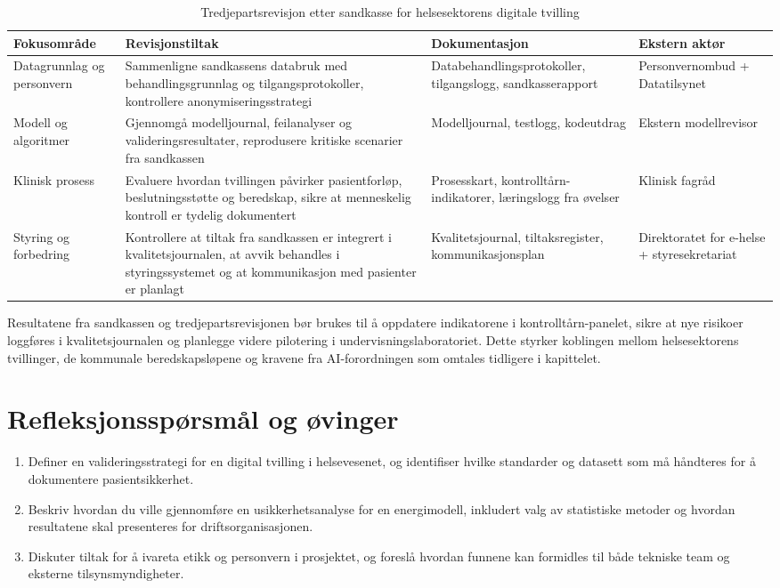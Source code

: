 \begin{table}[ht]
    \centering
    \caption{Tredjepartsrevisjon etter sandkasse for helsesektorens digitale tvilling}
    \label{tab:tredjepartsrevisjon}
    \begin{tabular}{|p{3.2cm}|p{4.6cm}|p{4.6cm}|p{3.0cm}|}
        \hline
        \textbf{Fokusområde} & \textbf{Revisjonstiltak} & \textbf{Dokumentasjon} & \textbf{Ekstern aktør} \\
        \hline
        Datagrunnlag og personvern & Sammenligne sandkassens databruk med behandlingsgrunnlag og tilgangsprotokoller, kontrollere anonymiseringsstrategi & Databehandlingsprotokoller, tilgangslogg, sandkasserapport & Personvernombud + Datatilsynet \\
        \hline
        Modell og algoritmer & Gjennomgå modelljournal, feilanalyser og valideringsresultater, reprodusere kritiske scenarier fra sandkassen & Modelljournal, testlogg, kodeutdrag & Ekstern modellrevisor \\
        \hline
        Klinisk prosess & Evaluere hvordan tvillingen påvirker pasientforløp, beslutningsstøtte og beredskap, sikre at menneskelig kontroll er tydelig dokumentert & Prosesskart, kontrolltårn-indikatorer, læringslogg fra øvelser & Klinisk fagråd \\
        \hline
        Styring og forbedring & Kontrollere at tiltak fra sandkassen er integrert i kvalitetsjournalen, at avvik behandles i styringssystemet og at kommunikasjon med pasienter er planlagt & Kvalitetsjournal, tiltaksregister, kommunikasjonsplan & Direktoratet for e-helse + styresekretariat \\
        \hline
    \end{tabular}
\end{table}

Resultatene fra sandkassen og tredjepartsrevisjonen bør brukes til å oppdatere indikatorene i kontrolltårn-panelet, sikre at nye risikoer loggføres i kvalitetsjournalen og planlegge videre pilotering i undervisningslaboratoriet. Dette styrker koblingen mellom helsesektorens tvillinger, de kommunale beredskapsløpene og kravene fra AI-forordningen som omtales tidligere i kapittelet.

\section{Refleksjonsspørsmål og øvinger}
\begin{enumerate}
    \item Definer en valideringsstrategi for en digital tvilling i helsevesenet, og identifiser hvilke standarder og datasett som må håndteres for å dokumentere pasientsikkerhet.
    \item Beskriv hvordan du ville gjennomføre en usikkerhetsanalyse for en energimodell, inkludert valg av statistiske metoder og hvordan resultatene skal presenteres for driftsorganisasjonen.
    \item Diskuter tiltak for å ivareta etikk og personvern i prosjektet, og foreslå hvordan funnene kan formidles til både tekniske team og eksterne tilsynsmyndigheter.
\end{enumerate}

